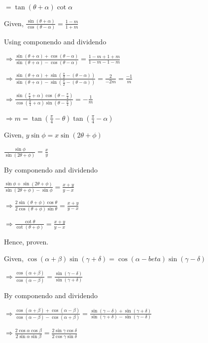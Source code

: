   $= \tan(\theta + \alpha)\cot\alpha$

\item Given, $\frac{\sin(\theta + \alpha)}{\cos(\theta - \alpha)} = \frac{1 - m}{1 + m}$

  Using componendo and dividendo

  $\Rightarrow \frac{\sin(\theta + \alpha) + \cos(\theta - \alpha)}{\sin(\theta + \alpha) - \cos(\theta - \alpha)}
  = \frac{1 - m + 1 + m}{1 - m - 1 - m}$

  $\Rightarrow \frac{\sin(\theta + \alpha) + \sin\left(\frac{\pi}{2} - (\theta - \alpha)\right)}{\sin(\theta + \alpha) -
    \sin\left(\frac{\pi}{2} - (\theta - \alpha)\right)} = \frac{2}{-2m} = \frac{-1}{m}$

  $\Rightarrow \frac{\sin\left(\frac{\pi}{4} + \alpha\right)\cos\left(\theta -
    \frac{\pi}{4}\right)}{\cos\left(\frac{\pi}{4} + \alpha\right)\sin\left(\theta - \frac{\pi}{4}\right)} = -\frac{1}{m}$

  $\Rightarrow m = \tan\left(\frac{\pi}{4} - \theta\right)\tan\left(\frac{\pi}{4} - \alpha\right)$

\item Given, $y\sin\phi = x\sin(2\theta + \phi)$

  $\frac{\sin\phi}{\sin(2\theta + \phi)} = \frac{x}{y}$

  By componendo and dividendo

  $\frac{\sin\phi + \sin(2\theta + \phi)}{\sin(2\theta + \phi) - \sin\phi} = \frac{x + y}{y - x}$

  $\Rightarrow \frac{2\sin(\theta + \phi)\cos\theta}{2\cos(\theta + \phi)\sin\theta} = \frac{x + y}{y - x}$

  $\Rightarrow \frac{\cot\theta}{\cot(\theta + \phi)} = \frac{x + y}{y - x}$

  Hence, proven.

\item Given, $\cos(\alpha + \beta)\sin(\gamma + \delta) = \cos(\alpha - beta)\sin(\gamma - \delta)$

  $\Rightarrow \frac{\cos(\alpha + \beta)}{\cos(\alpha - \beta)} = \frac{\sin(\gamma - \delta)}{\sin(\gamma + \delta)}$

  By componendo and dividendo

  $\Rightarrow \frac{\cos(\alpha + \beta) + \cos(\alpha - \beta)}{\cos(\alpha - \beta) - \cos(\alpha + \beta)} =
  \frac{\sin(\gamma - \delta) + \sin(\gamma + \delta)}{\sin(\gamma + \delta) - \sin(\gamma - \delta)}$


  $\Rightarrow \frac{2\cos\alpha\cos\beta}{2\sin\alpha\sin\beta} = \frac{2\sin\gamma\cos\delta}{2\cos\gamma\sin\delta}$


